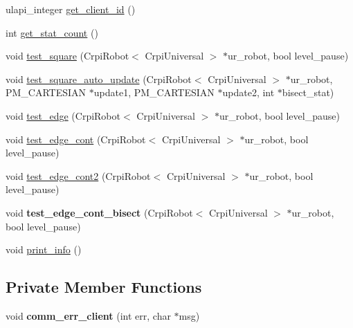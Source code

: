 \begin{DoxyCompactItemize}
\item 
ulapi\+\_\+integer \mbox{\hyperlink{classcart__comm__client_ae7aa5e3ce2b4192163d24fee40191411}{get\+\_\+client\+\_\+id}} ()
\item 
int \mbox{\hyperlink{classcart__comm__client_af857bf6da9431c0ebfa1862bf54ba912}{get\+\_\+stat\+\_\+count}} ()
\item 
void \mbox{\hyperlink{classcart__comm__client_a4ea2b789160e7d1580e6d47d31561f28}{test\+\_\+square}} (Crpi\+Robot$<$ Crpi\+Universal $>$ $\ast$ur\+\_\+robot, bool level\+\_\+pause)
\item 
void \mbox{\hyperlink{classcart__comm__client_aaa588482b9a7b89a473bd88125aa833a}{test\+\_\+square\+\_\+auto\+\_\+update}} (Crpi\+Robot$<$ Crpi\+Universal $>$ $\ast$ur\+\_\+robot, P\+M\+\_\+\+C\+A\+R\+T\+E\+S\+I\+AN $\ast$update1, P\+M\+\_\+\+C\+A\+R\+T\+E\+S\+I\+AN $\ast$update2, int $\ast$bisect\+\_\+stat)
\item 
void \mbox{\hyperlink{classcart__comm__client_ac90c32ff9efabd33ecf499fa4e5d95cb}{test\+\_\+edge}} (Crpi\+Robot$<$ Crpi\+Universal $>$ $\ast$ur\+\_\+robot, bool level\+\_\+pause)
\item 
void \mbox{\hyperlink{classcart__comm__client_ad2e607ccbc2c1b02c25c252a2eaea521}{test\+\_\+edge\+\_\+cont}} (Crpi\+Robot$<$ Crpi\+Universal $>$ $\ast$ur\+\_\+robot, bool level\+\_\+pause)
\item 
void \mbox{\hyperlink{classcart__comm__client_ac44548dbca7cf94a77e014d3650fd763}{test\+\_\+edge\+\_\+cont2}} (Crpi\+Robot$<$ Crpi\+Universal $>$ $\ast$ur\+\_\+robot, bool level\+\_\+pause)
\item 
\mbox{\label{classcart__comm__client_a997c5d40abc9a3ddcd56504f3e9413ea}} 
void {\bfseries test\+\_\+edge\+\_\+cont\+\_\+bisect} (Crpi\+Robot$<$ Crpi\+Universal $>$ $\ast$ur\+\_\+robot, bool level\+\_\+pause)
\item 
void \mbox{\hyperlink{classcart__comm__client_a1b98c6cdf26eea214854b6eec41486a8}{print\+\_\+info}} ()
\end{DoxyCompactItemize}
\subsection*{Private Member Functions}
\begin{DoxyCompactItemize}
\item 
\mbox{\label{classcart__comm__client_a07a9030a40b9d387f3c1a0eb7dffe7fe}} 
void {\bfseries comm\+\_\+err\+\_\+client} (int err, char $\ast$msg)
\end{DoxyCompactItemize}
